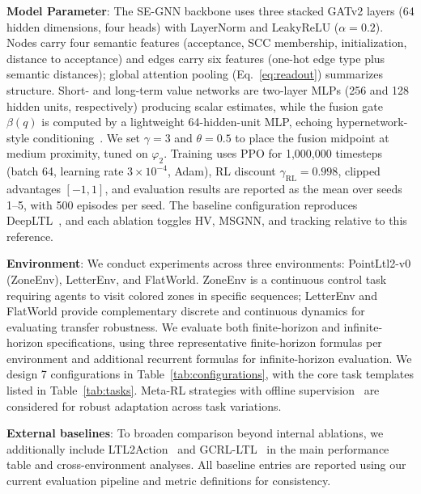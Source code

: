 \documentclass[journal]{IEEEtran}
\begin{document}
	\textbf{Model Parameter}: The SE-GNN backbone uses three stacked GATv2 layers (64 hidden dimensions, four heads) with LayerNorm and LeakyReLU ($\alpha = 0.2$). Nodes carry four semantic features (acceptance, SCC membership, initialization, distance to acceptance) and edges carry six features (one-hot edge type plus semantic distances); global attention pooling (Eq.~\ref{eq:readout}) summarizes structure. Short- and long-term value networks are two-layer MLPs (256 and 128 hidden units, respectively) producing scalar estimates, while the fusion gate $\beta(q)$ is computed by a lightweight 64-hidden-unit MLP, echoing hypernetwork-style conditioning~\citep{klocek2019hypernetwork}. We set $\gamma = 3$ and $\theta = 0.5$ to place the fusion midpoint at medium proximity, tuned on $\varphi_2$. Training uses PPO for 1{,}000{,}000 timesteps (batch 64, learning rate $3 \times 10^{-4}$, Adam), RL discount $\gamma_{\text{RL}} = 0.998$, clipped advantages $[-1,1]$, and evaluation results are reported as the mean over seeds 1--5, with 500 episodes per seed. The baseline configuration reproduces DeepLTL~\citep{deepltl}, and each ablation toggles HV, MSGNN, and tracking relative to this reference.

	\textbf{Environment}: We conduct experiments across three environments: PointLtl2-v0 (ZoneEnv), LetterEnv, and FlatWorld. ZoneEnv is a continuous control task requiring agents to visit colored zones in specific sequences; LetterEnv and FlatWorld provide complementary discrete and continuous dynamics for evaluating transfer robustness. We evaluate both finite-horizon and infinite-horizon specifications, using three representative finite-horizon formulas per environment and additional recurrent formulas for infinite-horizon evaluation. We design 7 configurations in Table~\ref{tab:configurations}, with the core task templates listed in Table~\ref{tab:tasks}. Meta-RL strategies with offline supervision~\citep{pong2022offline} are considered for robust adaptation across task variations.

    \textbf{External baselines}: To broaden comparison beyond internal ablations, we additionally include LTL2Action~\citep{Vaezipoor2021} and GCRL-LTL~\citep{Jothimurugan2021} in the main performance table and cross-environment analyses. All baseline entries are reported using our current evaluation pipeline and metric definitions for consistency.
\end{document}
